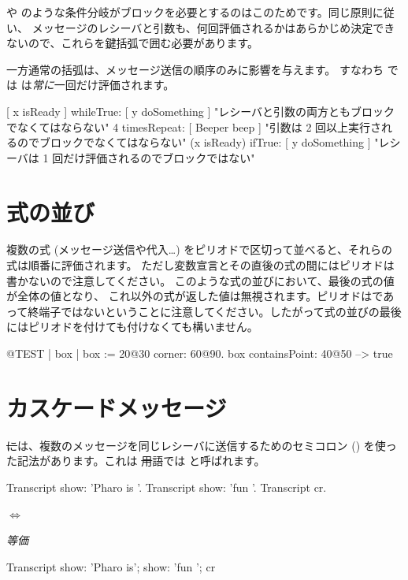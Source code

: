 \documentclass[a4paper,10pt,twoside]{book}
\begin{document}
 や  のような条件分岐がブロックを必要とするのはこのためです。同じ原則に従い、 メッセージのレシーバと引数も、何回評価されるかはあらかじめ決定できないので、これらを鍵括弧で囲む必要があります。

一方通常の括弧は、メッセージ送信の順序のみに影響を与えます。
すなわち  では  は\emph{常に}一回だけ評価されます。

\begin{code}{}
[ x isReady ] whileTrue: [ y doSomething ]   "レシーバと引数の両方ともブロックでなくてはならない"
4 timesRepeat: [ Beeper beep ]                   "引数は 2 回以上実行されるのでブロックでなくてはならない"
(x isReady) ifTrue: [ y doSomething ]           "レシーバは 1 回だけ評価されるのでブロックではない"
\end{code}

\section{式の並び}
複数の式 (\ie メッセージ送信や代入\dots) をピリオドで区切って並べると、それらの式は順番に評価されます。
ただし変数宣言とその直後の式の間にはピリオドは書かないので注意してください。
このような式の並びにおいて、最後の式の値が全体の値となり、
これ以外の式が返した値は無視されます。ピリオドはであって終端子ではないということに注意してください。したがって式の並びの最後にはピリオドを付けても付けなくても構いません。

\begin{code}{@TEST}
| box |
box := 20@30 corner: 60@90.
box containsPoint: 40@50 --> true
\end{code}

\section{カスケードメッセージ}
\st には、複数のメッセージを同じレシーバに送信するためのセミコロン (\ct{;}) を使った記法があります。これは \st 用語では  と呼ばれます。


\begin{minipage}{0.35\textwidth}
\begin{code}{}
Transcript show: 'Pharo is '.
Transcript show: 'fun '.
Transcript cr.
\end{code}
\end{minipage}
\begin{minipage}{0.15\textwidth}
\begin{center}
$\Longleftrightarrow$

\emph{等価}
\end{center}
\end{minipage}
\begin{minipage}{0.35\textwidth}
\begin{code}{}
Transcript        
   show: 'Pharo is';
   show: 'fun ';
   cr
\end{code}
\end{minipage}
\end{document}
